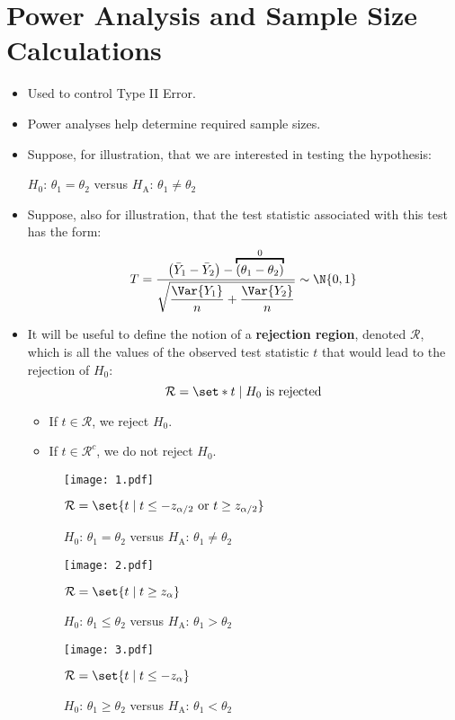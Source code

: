 \section{Power Analysis and Sample Size Calculations}
\begin{itemize}
      \item Used to control Type II Error.
      \item Power analyses help determine required sample sizes.
      \item Suppose, for illustration, that we are interested in testing the hypothesis:

            \centerline{$ H_0 $: $ \theta_1=\theta_2 $ versus $ H_\text{A} $: $ \theta_1\ne \theta_2 $}
      \item Suppose, also for illustration, that the test statistic associated with this test has
            the form:
            \[ T=\frac{\bigl(\bar{Y}_1-\bar{Y}_2\bigr)-\overbracket{(\theta_1-\theta_2)}^0}{\displaystyle \sqrt{\frac{\Var{Y_1}}{n}+\frac{\Var{Y_2}}{n} }}\sim \N{0,1}  \]
      \item It will be useful to define the notion of a \textbf{rejection region}, denoted $ \mathcal{R} $,
            which is all the values of the observed test statistic $ t $ that would lead to the rejection
            of $ H_0 $:
            \[ \mathcal{R}=\set*{t\mid H_0\text{ is rejected}} \]
            \begin{itemize}
                  \item If $ t\in\mathcal{R} $, we reject $ H_0 $.
                  \item If $ t\in\mathcal{R}^c $, we do not reject $ H_0 $.
            \end{itemize}
            \begin{figure}[!htbp]
                  \centering
                  \texttt{[image: 1.pdf]}
                  \caption{$ H_0 $: $ \theta_1=\theta_2 $ versus $ H_\text{A} $: $ \theta_1\ne \theta_2 $}{$ \mathcal{R}=\set{t\mid t\le -z_{\alpha/2}\text{ or }t\ge z_{\alpha/2}} $}
            \end{figure}
            \begin{figure}[!htbp]
                  \centering
                  \texttt{[image: 2.pdf]}
                  \caption{$ H_0 $: $ \theta_1\le\theta_2 $ versus $ H_\text{A} $: $ \theta_1>\theta_2 $}{$ \mathcal{R}=\set{t\mid t\ge z_{\alpha}} $}
            \end{figure}
            \begin{figure}[!htbp]
                  \centering
                  \texttt{[image: 3.pdf]}
                  \caption{$ H_0 $: $ \theta_1\ge\theta_2 $ versus $ H_\text{A} $: $ \theta_1<\theta_2 $}{$ \mathcal{R}=\set{t\mid t\le -z_{\alpha}} $}
            \end{figure}
\end{itemize}
